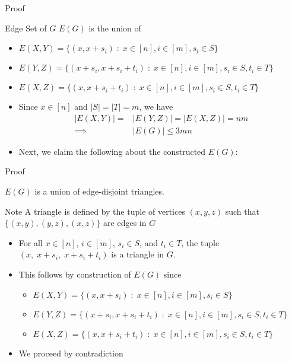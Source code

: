 \begin{frame}{Proof}

\begin{block}{Edge Set of $G$}
$E(G)$ is the union of
\begin{itemize}
	\item $E(X,Y) = \big\lbrace (x, x+s_i)\;\colon\; x\in [n], i \in [m], s_i \in S \big\rbrace$
	\item $E(Y,Z) = \big\lbrace (x+s_i, x+s_i+t_i)\;\colon\; x\in[n], i\in[m], s_i \in S, t_i \in T \big\rbrace$
	\item $E(X,Z) = \big\lbrace (x, x+s_i+t_i)\;\colon\; x\in[n], i\in[m], s_i \in S, t_i \in T \big\rbrace$
\end{itemize}
\end{block}
\begin{itemize}
	\item Since $x \in [n]$ and $|S|=|T|=m$, we have
	\begin{align*}
	|E(X,Y)| = &|E(Y,Z)| = |E(X,Z)| = nm\\
	\implies &|E(G)| \leq 3mn
	\end{align*}
	
	\item Next, we claim the following about the constructed $E(G)$:
\end{itemize}

\end{frame}

\begin{frame}{Proof}

\begin{claim}
	$E(G)$ is a union of edge-disjoint triangles.
\end{claim}

\begin{block}{Note}
	A triangle is defined by the tuple of vertices $(x,y,z)$ such that $\big\lbrace (x,y), (y,z), (x,z) \big\rbrace$ are edges in $G$
\end{block}

\begin{itemize}
	\item For all $x\in [n]$, $i\in [m]$, $s_i \in S$, and $t_i \in T$, the tuple $(x,\; x+s_i,\; x+s_i+t_i)$ is a triangle in $G$.
	
	\item This follows by construction of $E(G)$ since
	\begin{itemize}
		\item $E(X,Y) = \big\lbrace (x, x+s_i)\;\colon\; x\in [n], i \in [m], s_i \in S \big\rbrace$
		\item $E(Y,Z) = \big\lbrace (x+s_i, x+s_i+t_i)\;\colon\; x\in[n], i\in[m], s_i \in S, t_i \in T \big\rbrace$
		\item $E(X,Z) = \big\lbrace (x, x+s_i+t_i)\;\colon\; x\in[n], i\in[m], s_i \in S, t_i \in T \big\rbrace$
	\end{itemize}
	\item We proceed by contradiction
\end{itemize}
\end{frame}

